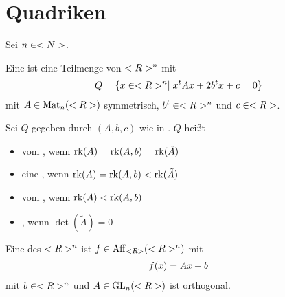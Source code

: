 \section{Quadriken}

Sei $n\in<N>$.

\begin{definition}[Quadrik]
	Eine  ist eine Teilmenge von $<R>^n$ mit
	\begin{align}
		Q=\{x\in<R>^n\mid x^tAx+2b^tx+c=0\}\notag
	\end{align}
	mit $A\in\operatorname{Mat}_n(<R>)$ symmetrisch, $b^t\in<R>^n$ und $c\in<R>$.
\end{definition}

\begin{definition}
	Sei $Q$ gegeben durch $(A,b,c)$ wie in . $Q$ heißt
	\begin{itemize}
		\item vom , wenn $\operatorname{rk}(A)=\operatorname{rk}(A,b)=\operatorname{rk}(\tilde{A})$
		\item eine , wenn $\operatorname{rk}(A)=\operatorname{rk}(A,b)<\operatorname{rk}(\tilde{A})$
		\item vom , wenn $\operatorname{rk}(A)<\operatorname{rk}(A,b)$
		\item {}, wenn $\det(\tilde{A})=0$
	\end{itemize}
\end{definition}

\begin{definition}[Isometrie]
	Eine  des $<R>^n$ ist $f\in\operatorname{Aff}_{<R>}(<R>^n)$ mit
	\begin{align}
		f(x)=Ax+b\notag
	\end{align}
	mit $b\in<R>^n$ und $A\in\operatorname{GL}_n(<R>)$ ist orthogonal.
\end{definition}